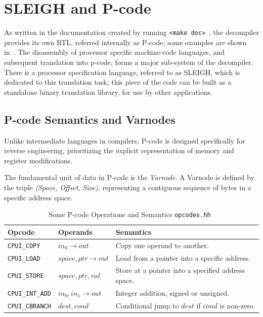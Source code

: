 \section{SLEIGH and P-code}\label{sec:slap}

As written in the documentation created by running \texttt{<make doc>}~\cite{DOC:shareGhidraDecompiler}, the 
decompiler provides its own \ac{RTL}, referred internally as P-code; some examples are shown in~. The disassembly of processor
specific machine-code languages, and subsequent translation into p-code, forms a major sub-system 
of the decompiler. There is a processor specification language, referred to as SLEIGH, which is 
dedicated to this translation task; this piece of the code can be built as a standalone binary 
translation library, for use by other applications.

\subsection{P-code Semantics and Varnodes}
Unlike intermediate languages in compilers, P-code is designed specifically for reverse engineering, prioritizing the explicit representation of memory and register modifications.

The fundamental unit of data in P-code is the \emph{Varnode}. A Varnode is defined by the triple \emph{(Space, Offset, Size)}, representing a contiguous sequence of bytes in a specific address space.

\begin{table}[ht]
    \centering
    \caption{Some P-code Operations and Semantics \texttt{opcodes.hh}~\cite{DOC:shareGhidraDecompiler, DOC:spinselPCodeReference}}\label{tab:pcode_ops}
    \begin{tabular}{l p{} p{}}
        \toprule
        \textbf{Opcode} & \textbf{Operands} & \textbf{Semantics} \\
        \midrule
        \texttt{CPUI\_COPY } & $in_0 \rightarrow out$ & Copy one operand to another. \\
        \texttt{CPUI\_LOAD } & $space, ptr \rightarrow out$ & Load from a pointer into a specific address. \\
        \texttt{CPUI\_STORE} & $space, ptr, val$ & Store at a pointer into a specified address space. \\
        \texttt{CPUI\_INT\_ADD} & $in_0, in_1 \rightarrow out$ & Integer addition, signed or unsigned. \\
        \texttt{CPUI\_CBRANCH} & $dest, cond$ & Conditional jump to $dest$ if $cond$ is non-zero. \\
        \bottomrule
    \end{tabular}
\end{table}

